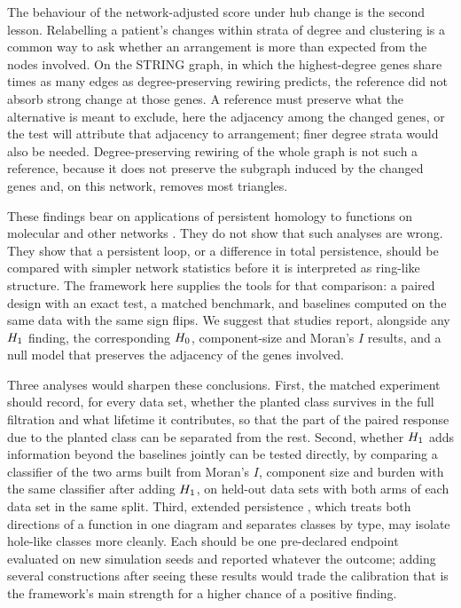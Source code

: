 The behaviour of the network-adjusted score under hub change is the second lesson. Relabelling a patient's changes within strata of degree and clustering is a common way to ask whether an arrangement is more than expected from the nodes involved. On the STRING graph, in which the highest-degree genes share \hubHubRatio{} times as many edges as degree-preserving rewiring predicts, the reference did not absorb strong change at those genes. A reference must preserve what the alternative is meant to exclude, here the adjacency among the changed genes, or the test will attribute that adjacency to arrangement; finer degree strata would also be needed. Degree-preserving rewiring of the whole graph is not such a reference, because it does not preserve the subgraph induced by the changed genes and, on this network, removes most triangles.

These findings bear on applications of persistent homology to functions on molecular and other networks \citep{masoomy2021,ramos2025,song2023,abdullahi2025,lee2012}. They do not show that such analyses are wrong. They show that a persistent loop, or a difference in total persistence, should be compared with simpler network statistics before it is interpreted as ring-like structure. The framework here supplies the tools for that comparison: a paired design with an exact test, a matched benchmark, and baselines computed on the same data with the same sign flips. We suggest that studies report, alongside any $H_{1}$ finding, the corresponding $H_{0}$, component-size and Moran's $I$ results, and a null model that preserves the adjacency of the genes involved.

Three analyses would sharpen these conclusions. First, the matched experiment should record, for every data set, whether the planted class survives in the full filtration and what lifetime it contributes, so that the part of the paired response due to the planted class can be separated from the rest. Second, whether $H_{1}$ adds information beyond the baselines jointly can be tested directly, by comparing a classifier of the two arms built from Moran's $I$, component size and burden with the same classifier after adding $H_{1}$, on held-out data sets with both arms of each data set in the same split. Third, extended persistence \citep{cohensteiner2009}, which treats both directions of a function in one diagram and separates classes by type, may isolate hole-like classes more cleanly. Each should be one pre-declared endpoint evaluated on new simulation seeds and reported whatever the outcome; adding several constructions after seeing these results would trade the calibration that is the framework's main strength for a higher chance of a positive finding.

